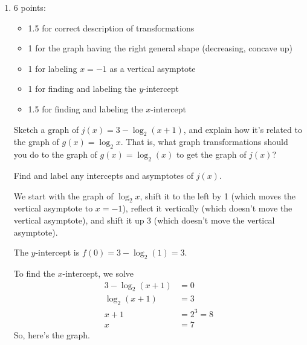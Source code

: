 \documentclass{article}
\begin{document}
\begin{enumerate}
\begin{enumerate}
  \item

    \begin{grading}
      6 points:
      \begin{itemize}[nosep]
      \item 1.5 for correct description of transformations
      \item 1 for the graph having the right general shape (decreasing, concave up)
      \item 1 for labeling $x = -1$ as a vertical asymptote
      \item 1 for finding and labeling the $y$-intercept
      \item 1.5 for finding and labeling the $x$-intercept
      \end{itemize}
    \end{grading} 

    \begin{problem}[\stretch{1.25}]
      Sketch a graph of $j(x) = 3 - \log_2 (x + 1)$, and explain how it's related to the graph of $g(x) = \log_2 x$. That is, what graph transformations should you do to the graph of $g(x) = \log_2(x)$ to get the graph of $j(x)$? 

      Find and label any intercepts and asymptotes of $j(x)$. 
    \end{problem}

    \begin{solution} 
      We start with the graph of $\log_2 x$, shift it to the left by 1 (which moves the vertical asymptote to $x = -1$), reflect it vertically (which doesn't move the vertical asymptote), and shift it up 3 (which doesn't move the vertical asymptote). 

      The $y$-intercept is $f(0) = 3 - \log_2(1) = 3$.

      To find the $x$-intercept, we solve
      \begin{align*}
        3 - \log_2 (x + 1) &= 0 \\
        \log_2 (x + 1) &= 3 \\
        x + 1 &= 2^3 = 8 \\
        x &= 7
      \end{align*}
      So, here's the graph.
      \begin{center}
      \end{center}
    \end{solution} 


\end{enumerate}
\end{enumerate}
\end{document}
